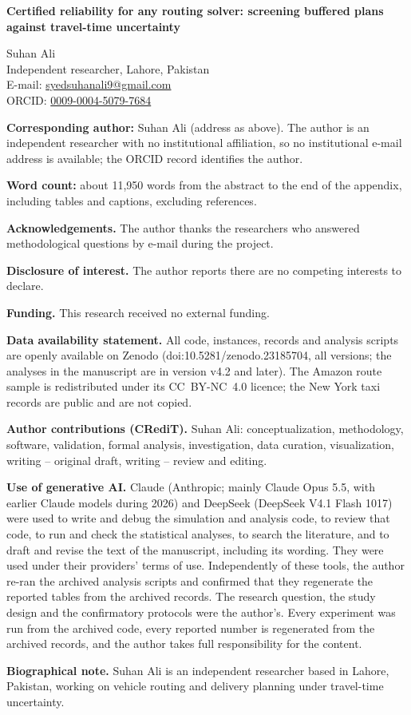\documentclass[11pt,a4paper]{article}
\begin{document}
\begin{flushleft}
{\Large\bfseries Certified reliability for any routing solver: screening buffered plans against
travel-time uncertainty\par}
\bigskip
Suhan Ali\\
Independent researcher, Lahore, Pakistan\\
E-mail: \href{mailto:syedsuhanali9@gmail.com}{syedsuhanali9@gmail.com}\\
ORCID: \href{https://orcid.org/0009-0004-5079-7684}{0009-0004-5079-7684}

\bigskip
\textbf{Corresponding author:} Suhan Ali (address as above). The author is an independent
researcher with no institutional affiliation, so no institutional e-mail address is available;
the ORCID record identifies the author.

\textbf{Word count:} about 11{,}950 words from the abstract to the end of the appendix,
including tables and captions, excluding references.

\bigskip
\textbf{Acknowledgements.} The author thanks the researchers who answered methodological
questions by e-mail during the project.

\textbf{Disclosure of interest.} The author reports there are no competing interests to declare.

\textbf{Funding.} This research received no external funding.

\textbf{Data availability statement.} All code, instances, records and analysis scripts are
openly available on Zenodo (doi:10.5281/zenodo.23185704, all versions; the analyses in the
manuscript are in version v4.2 and later). The Amazon route sample is redistributed under its
CC~BY-NC~4.0 licence; the New York taxi records are public and are not copied.

\textbf{Author contributions (CRediT).} Suhan Ali: conceptualization, methodology,
software, validation, formal analysis, investigation, data curation, visualization,
writing -- original draft, writing -- review and editing.

\textbf{Use of generative AI.} Claude (Anthropic; mainly Claude Opus 5.5, with earlier Claude
models during 2026) and DeepSeek (DeepSeek V4.1 Flash 1017) were used to write and debug
the simulation and analysis code, to review that code, to run and check the statistical
analyses, to search the literature, and to draft and revise the text of the manuscript,
including its wording. They were used under their providers' terms of use. Independently
of these tools, the author re-ran the archived analysis scripts and confirmed that they
regenerate the reported tables from the archived records. The research
question, the study design and the confirmatory protocols were the author's. Every experiment
was run from the archived code, every reported number is regenerated from the archived records,
and the author takes full responsibility for the content.
\bigskip

\textbf{Biographical note.} Suhan Ali is an independent researcher based in Lahore,
Pakistan, working on vehicle routing and delivery planning under travel-time
uncertainty.
\end{flushleft}
\end{document}
